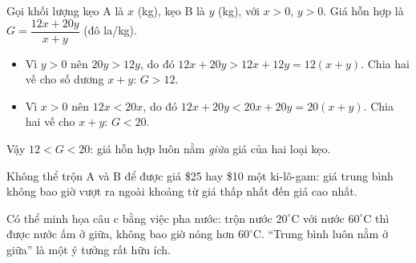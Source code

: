 {
Gọi khối lượng kẹo A là $x$ (kg), kẹo B là $y$ (kg), với $x>0$, $y>0$. Giá hỗn hợp là $G=\dfrac{12x+20y}{x+y}$ (đô la/kg).
\begin{itemize}[leftmargin=1.3em,itemsep=1pt]
\item Vì $y>0$ nên $20y>12y$, do đó $12x+20y>12x+12y=12(x+y)$. Chia hai vế cho số dương $x+y$: $G>12$.
\item Vì $x>0$ nên $12x<20x$, do đó $12x+20y<20x+20y=20(x+y)$. Chia hai vế cho $x+y$: $G<20$.
\end{itemize}
Vậy $12<G<20$: giá hỗn hợp luôn nằm \emph{giữa} giá của hai loại kẹo.
\begin{warnbox}Không thể trộn A và B để được giá \$25 hay \$10 một ki-lô-gam: giá trung bình không bao giờ vượt ra ngoài khoảng từ giá thấp nhất đến giá cao nhất.\end{warnbox}
\begin{parentbox}Có thể minh họa câu c bằng việc pha nước: trộn nước $20^\circ$C với nước $60^\circ$C thì được nước ấm ở giữa, không bao giờ nóng hơn $60^\circ$C. ``Trung bình luôn nằm ở giữa'' là một ý tưởng rất hữu ích.\end{parentbox}
}
